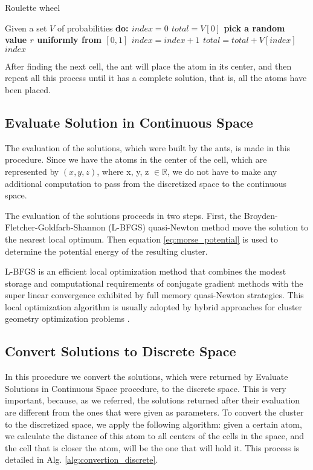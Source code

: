 			\begin{algorithm}
				\caption{Roulette wheel}
				\label{alg:roulette_wheel}
				\begin{algorithmic}
				\STATE Given a set $V$ of probabilities \bf{do}:
				\STATE $index = 0$
				\STATE $total = V[0]$
				\STATE pick a random value $r$ uniformly from $[0,1]$
					\STATE $index = index + 1$
					\STATE $total = total + V[index]$		
				\ENDWHILE
				\RETURN $index$
				\end{algorithmic}
			\end{algorithm}
			
			After finding the next cell, the ant will place the atom in its center, and then repeat all this process until it has a complete solution, that is, all the atoms have been placed.
			
			\subsection{Evaluate Solution in Continuous Space}
			
			The evaluation of the solutions, which were built by the ants, is made in this procedure. Since we have the atoms in the center of the cell, which are represented by $(x,y,z)$, where x, y, z $\in \mathbb{R}$, we do not have to make any additional computation to pass from the discretized space to the continuous space.
			
			The evaluation of the solutions proceeds in two steps. First, the Broyden-Fletcher-Goldfarb-Shannon (L-BFGS) quasi-Newton method \cite{liu89} move the solution to the nearest local optimum. Then equation \ref{eq:morse_potential} is used to determine the potential energy of the resulting cluster.

			L-BFGS is an efficient local optimization method that combines the modest storage and computational requirements of conjugate gradient methods with the super linear convergence exhibited by full memory quasi-Newton strategies. This local optimization algorithm is usually adopted by hybrid approaches for cluster geometry optimization problems \cite{grosso07, johnston03, xico09}.
						
			\subsection{Convert Solutions to Discrete Space}
			In this procedure we convert the solutions, which were returned by Evaluate Solutions in Continuous Space procedure, to the discrete space. This is very important, because, as we referred, the solutions returned after their evaluation are different from the ones that were given as parameters.
			To convert the cluster to the discretized space, we apply the following algorithm: given a certain atom, we calculate the distance of this atom to all centers of the cells in the space, and the cell that is closer the atom, will be the one that will hold it. This process is detailed in Alg. \ref{alg:convertion_discrete}.
			
